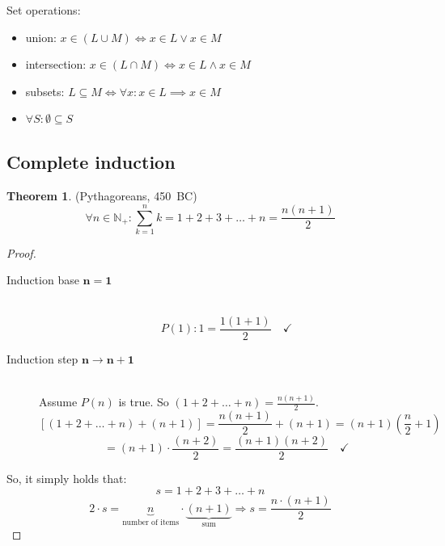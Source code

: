 \documentclass[a4paper,landscape,twocolumn]{article}
\theoremstyle{definition}
\newtheorem{theorem}{Theorem}
\begin{document}
Set operations:
\begin{itemize}
  \item union: $x \in (L \cup M) \iff x \in L \lor x \in M$
  \item intersection: $x \in (L \cap M) \iff x \in L \land x \in M$
  \item subsets: $L \subseteq M \iff \forall x: x \in L \implies x \in M$
  \item $\forall S: \emptyset \subseteq S$
\end{itemize}

\subsection{Complete induction}

\begin{theorem} (Pythagoreans, 450~BC)
  \[ \forall n \in \mathbb N_+: \sum_{k=1}^n k = 1 + 2 + 3 + \dots + n = \frac{n (n+1)}{2} \]
\end{theorem}
\begin{proof}
  \begin{description}
    \item[Induction base $\mathbf{n = 1}$] \hfill{} \\
      \[ P(1): 1 = \frac{1 (1+1)}{2} \quad\checkmark \]
    \item[Induction step $\mathbf{n \rightarrow n + 1}$] \hfill{} \\
      Assume $P(n)$ is true.
      So $(1 + 2 + \dots + n) = \frac{n (n+1)}{2}$.
      \[ \left[(1 + 2 + \dots + n) + (n + 1)\right] = \frac{n(n+1)}{2} + (n+1) = (n+1) \left(\frac n2 + 1\right) \]
      \[ = (n+1) \cdot \frac{(n+2)}{2} = \frac{(n+1)(n+2)}{2} \quad\checkmark \]
  \end{description}

  So, it simply holds that:
  \[ s = 1 + 2 + 3 + \dots + n \]
  \[ 2 \cdot s = \underbrace{n}_{\text{number of items}} \cdot \underbrace{(n + 1)}_{\text{sum}} \Rightarrow s = \frac{n \cdot (n + 1)}{2} \]
\end{proof}
\end{document}
